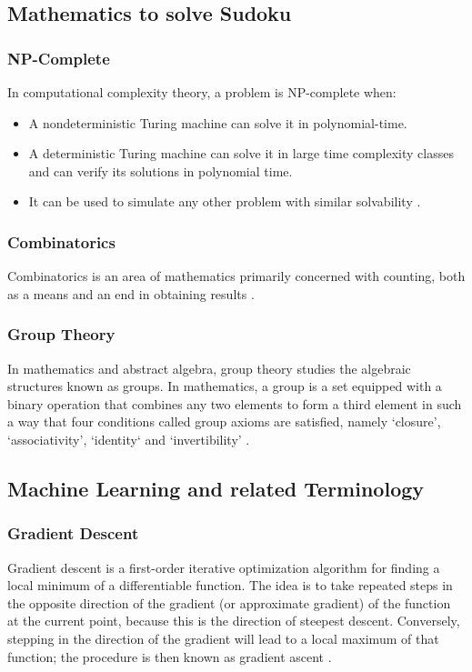 \documentclass[12pt, a4paper]{report}
\begin{document}
\subsection{Mathematics to solve Sudoku}
\label{subsec:mpf}

\subsubsection{NP-Complete}
In computational complexity theory, a problem is NP-complete when:
\begin{itemize}
    \item A nondeterministic Turing machine can solve it in polynomial-time.
    \item A deterministic Turing machine can solve it in large time complexity classes and can verify its solutions in polynomial time.
    \item It can be used to simulate any other problem with similar solvability \cite{wiki:npcmpt}.
\end{itemize}

\subsubsection{Combinatorics}
Combinatorics is an area of mathematics primarily concerned with counting, both as a means and an end in obtaining results \cite{wiki:combt}.

\subsubsection{Group Theory}
\label{subsec:combnt}
In mathematics and abstract algebra, group theory studies the algebraic structures known as groups. In mathematics, a group is a set equipped with a binary operation that combines any two elements to form a third element in such a way that four conditions called group axioms are satisfied, namely `closure', `associativity', `identity` and `invertibility' \cite{wiki:grpt} \cite{wiki:grps}.

\subsection{Machine Learning and related Terminology}
\label{mlrt}

\subsubsection{Gradient Descent}
Gradient descent is a first-order iterative optimization algorithm for finding a local minimum of a differentiable function. The idea is to take repeated steps in the opposite direction of the gradient (or approximate gradient) of the function at the current point, because this is the direction of steepest descent. Conversely, stepping in the direction of the gradient will lead to a local maximum of that function; the procedure is then known as gradient ascent \cite{wiki:grdsc}.
\end{document}
